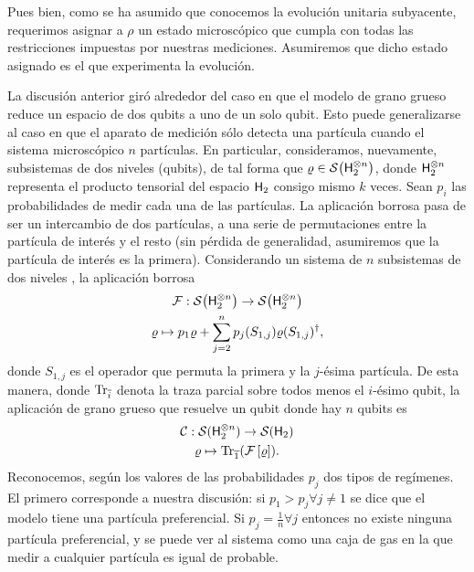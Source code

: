 Pues bien, como se ha asumido que conocemos la evolución unitaria subyacente, requerimos asignar a $\rho$ un estado microscópico que cumpla con todas las restricciones impuestas por nuestras mediciones. Asumiremos que dicho estado asignado es el que experimenta la evolución. 


La discusión anterior giró alrededor del caso en que el modelo de grano grueso reduce un espacio de dos qubits a uno de un solo qubit. Esto puede generalizarse al caso en que el aparato de medición sólo detecta una partícula cuando el sistema microscópico  $n$ partículas. En particular, consideramos, nuevamente, subsistemas de dos niveles (qubits), de tal forma que $\varrho\in\mathcal{S}\qty( {\sf H}_{2}^{\otimes n})$, donde ${\sf H}_{2}^{\otimes n}$ representa el producto tensorial del espacio ${\sf H}_{2}$ consigo mismo $k$ veces. Sean $p_{i}$ las probabilidades de medir cada una de las partículas. La aplicación borrosa pasa de ser un intercambio de dos partículas, a una serie de permutaciones entre la partícula de interés y el resto (sin pérdida de generalidad, asumiremos que la partícula de interés es la primera). Considerando un sistema de $n$ subsistemas de dos niveles , la aplicación borrosa 
\begin{gather}
    \mathcal{F}:\mathcal{S}\qty( {\sf H}_{2}^{\otimes n})\to \mathcal{S}\qty( {\sf H}_{2}^{\otimes n})\nonumber\\
    \varrho \mapsto p_{1}\varrho+\sum_{j=2}^{n}p_{j}(S_{1,j})\varrho(S_{1,j})^{\dagger},\nonumber
\end{gather}
donde $S_{1,j}$ es el operador que permuta la primera y la $j$-ésima partícula. De esta manera, donde $\Tr_{\overline{i}}$ denota la traza parcial sobre todos menos el $i$-ésimo qubit, la aplicación de grano grueso que resuelve un qubit donde hay $n$ qubits es
\begin{gather}\label{eq:CG}
    \mathcal{C}:\mathcal{S}( {\sf H}_{2}^{\otimes n})\to \mathcal{S}({\sf H}_{2})\nonumber\\
    \varrho\mapsto\Tr_{\overline{1}}(\mathcal{F}\left[\varrho\right]).
\end{gather}
Reconocemos, según los valores de las probabilidades $p_{j}$ dos tipos de regímenes. El primero corresponde a nuestra discusión: si $p_{1}>p_{j}\forall j\neq 1$ se dice que el modelo tiene una partícula preferencial. Si $p_{j}=\frac{1}{n}\forall j$ entonces no existe ninguna partícula preferencial, y se puede ver al sistema como una caja de gas en la que medir a cualquier partícula es igual de probable.